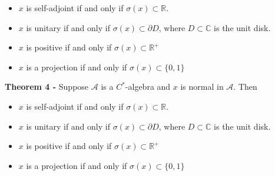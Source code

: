 \documentclass[12pt]{article}
\begin{document}
\begin{itemize}
\item $x$ is self-adjoint if and only if $\sigma(x) \subset \mathbb{R}$.
\item $x$ is unitary if and only if $\sigma(x) \subset \partial D$, where $D \subset \mathbb{C}$ is the unit disk.
\item $x$ is positive if and only if $\sigma(x) \subset \mathbb{R}^{+}$
\item $x$ is a projection if and only if $\sigma(x) \subset \{0,1\}$
\end{itemize}

{\bf Theorem 4 -} Suppose $\mathcal{A}$ is a $C^*$-algebra and $x$ is normal in $\mathcal{A}$. Then

\begin{itemize}
\item $x$ is self-adjoint if and only if $\sigma(x) \subset \mathbb{R}$.
\item $x$ is unitary if and only if $\sigma(x) \subset \partial D$, where $D \subset \mathbb{C}$ is the unit disk.
\item $x$ is positive if and only if $\sigma(x) \subset \mathbb{R}^{+}$
\item $x$ is a projection if and only if $\sigma(x) \subset \{0,1\}$
\end{itemize}

\end{document}
